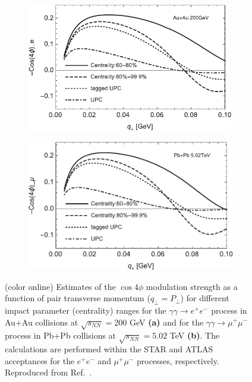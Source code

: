 \documentclass[12pt,epjc3]{svjour3}\sloppy
\begin{document}
\begin{figure}
    \centering
    \begin{subfigure}{.50\textwidth}
      \centering
      \includegraphics[width=0.99\textwidth]{fig/fig_7-crop.pdf}
      \caption{}
    \end{subfigure}%
    \begin{subfigure}{.50\textwidth}
      \centering
      \includegraphics[width=.99\linewidth]{fig/fig_12-crop.pdf}
      \caption{}
    \end{subfigure}
    \caption{(color online) Estimates of the $\cos4\phi$ modulation strength as a function of pair transverse momentum ($q_\perp = P_\perp$) for different impact parameter (centrality) ranges for the $\gamma\gamma \rightarrow e^+e^-$ process in Au$+$Au collisions at $\sqrt{s_{NN}}=200$ GeV \textbf{(a)} and for the $\gamma\gamma \rightarrow \mu^+\mu^-$ process in Pb$+$Pb collisions at $\sqrt{s_{NN}}=5.02$ TeV \textbf{(b)}. The calculations are performed within the STAR and ATLAS acceptances for the $e^+e^-$ and $\mu^+\mu^-$ processes, respectively. Reproduced from Ref.~\cite{liImpactParameterDependence2020}. }
    \label{fig:li_polarization}
\end{figure}
\end{document}
